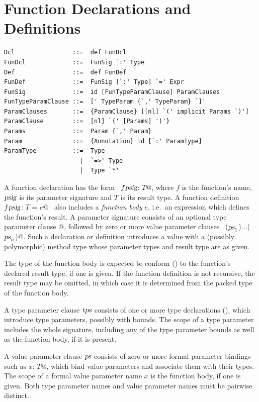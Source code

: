 \section{Function Declarations and Definitions}
\label{sec:funsigs}

\syntax\begin{lstlisting} 
Dcl                ::=  def FunDcl
FunDcl             ::=  FunSig `:' Type
Def                ::=  def FunDef
FunDef             ::=  FunSig [`:' Type] `=' Expr 
FunSig             ::=  id [FunTypeParamClause] ParamClauses
FunTypeParamClause ::=  [' TypeParam {`,' TypeParam} `]' 
ParamClauses       ::=  {ParamClause} [[nl] `(' implicit Params `)']
ParamClause        ::=  [nl] `(' [Params] ')'} 
Params             ::=  Param {`,' Param}
Param              ::=  {Annotation} id [`:' ParamType]
ParamType          ::=  Type 
                     |  `=>' Type 
                     |  Type `*'
\end{lstlisting}

A function declaration has the form ~\lstinline@def $f \mbox{\sl psig}$: $T$@, where
$f$ is the function's name, $\mbox{\sl psig}$ is its parameter
signature and $T$ is its result type. A function definition
~\lstinline@def $f \mbox{\sl psig}$: $T$ = $e$@~ also includes a {\em function body} $e$,
i.e.\ an expression which defines the function's result.  A parameter
signature consists of an optional type parameter clause \lstinline@[$\tps\,$]@,
followed by zero or more value parameter clauses
~\lstinline@($\mbox{\sl ps}_1$)$\ldots$($\mbox{\sl ps}_n$)@.  Such a declaration or definition
introduces a value with a (possibly polymorphic) method type whose
parameter types and result type are as given.

The type of the function body is expected to conform () 
to the function's declared
result type, if one is given. If the function definition is not
recursive, the result type may be omitted, in which case it is
determined from the packed type of the function body.

A type parameter clause $\mbox{\sl tps}$ consists of one or more type
declarations (), which introduce type parameters,
possibly with bounds.  The scope of a type parameter includes
the whole signature, including any of the type parameter bounds as
well as the function body, if it is present.  

A value parameter clause $\mbox{\sl ps}$ consists of zero or more formal
parameter bindings such as \lstinline@$x$: $T$@, which bind value
parameters and associate them with their types.  The scope of a formal
value parameter name $x$ is the function body, if one is
given. Both type parameter names and value parameter names must be
pairwise distinct.

